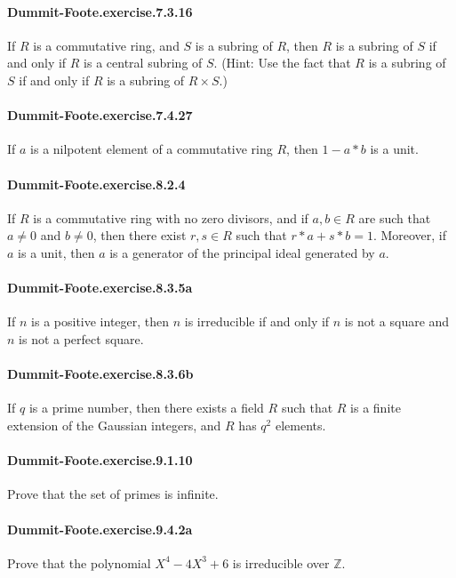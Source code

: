 \documentclass{article}
\begin{document}
\paragraph{Dummit-Foote.exercise.7.3.16} If $R$ is a commutative ring, and $S$ is a subring of $R$, then $R$ is a subring of $S$ if and only if $R$ is a central subring of $S$. (Hint: Use the fact that $R$ is a subring of $S$ if and only if $R$ is a subring of $R \times S$.)

\paragraph{Dummit-Foote.exercise.7.4.27} If $a$ is a nilpotent element of a commutative ring $R$, then $1-a*b$ is a unit.

\paragraph{Dummit-Foote.exercise.8.2.4} If $R$ is a commutative ring with no zero divisors, and if $a, b \in R$ are such that $a \neq 0$ and $b \neq 0$, then there exist $r, s \in R$ such that $r*a + s*b = 1$. Moreover, if $a$ is a unit, then $a$ is a generator of the principal ideal generated by $a$.

\paragraph{Dummit-Foote.exercise.8.3.5a} If $n$ is a positive integer, then $n$ is irreducible if and only if $n$ is not a square and $n$ is not a perfect square.

\paragraph{Dummit-Foote.exercise.8.3.6b} If $q$ is a prime number, then there exists a field $R$ such that $R$ is a finite extension of the Gaussian integers, and $R$ has $q^2$ elements.

\paragraph{Dummit-Foote.exercise.9.1.10} Prove that the set of primes is infinite.

\paragraph{Dummit-Foote.exercise.9.4.2a} Prove that the polynomial $X^4 - 4X^3 + 6$ is irreducible over $\mathbb{Z}$.
\end{document}
